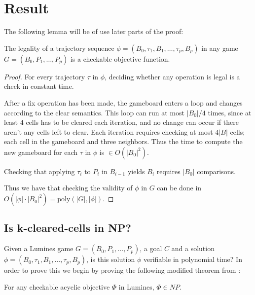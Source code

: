 \section{Result}
The following lemma will be of use later parts of the proof:\\

\begin{lem}
\label{lem:legality}
The legality of a trajectory sequence $\phi=(B_0, \tau_1, B_1, \ldots ,\tau_p, B_p)$ in any game $G=(B_0, P_1, \ldots, P_p)$ is a checkable objective function.
\end{lem}

\begin{proof}
For every trajectory $\tau$ in $\phi$, deciding whether any operation is legal is a check in constant time.

After a fix operation has been made, the gameboard enters a loop and changes according to the clear semantics. This loop can run at most $|B_0| / 4$ times, since at least 4 cells has to be cleared each iteration, and no change can occur if there aren't any cells left to clear. Each iteration requires checking at most $4|B|$ cells; each cell in the gameboard and three neighbors. Thus the time to compute the new gameboard for each $\tau$ in $\phi$ is $\in O(|B_0|^2)$.

Checking that applying $\tau_i$ to $P_i$ in $B_{i-1}$ yields $B_i$ requires $|B_0|$ comparisons. 

Thus we have that checking the validity of $\phi$ in $G$ can be done in $O(|\phi| \cdot |B_0|^2) = \text{poly}(|G|, |\phi|)$. 
\end{proof}

\subsection{Is k-cleared-cells in NP?}

Given a Lumines game $G = (B_0, P_1, \ldots, P_p)$, a goal $C$ and a solution $\phi = (B_0, \tau_1, B_1, \ldots ,\tau_p, B_p)$, is this solution $\phi$ verifiable in polynomial time? In order to prove this we begin by proving the following modified theorem from \cite{tetris}: \\

\begin{thm}
For any checkable acyclic objective $\Phi$ in Lumines, $\Phi \in NP$.
\end{thm}


